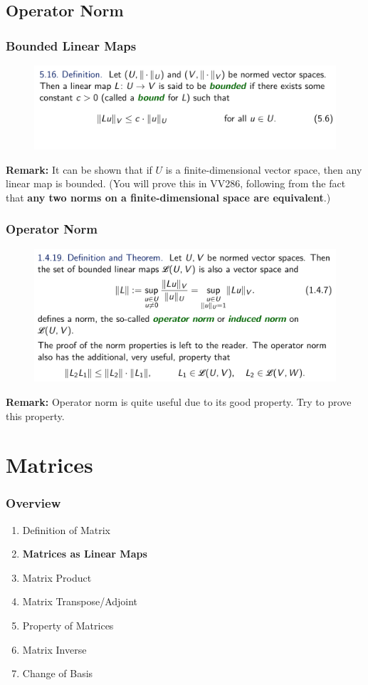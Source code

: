 \documentclass[12pt, t]{beamer}
\newcommand{\remark}{\textbf{Remark: }}
\begin{document}
\subsection{Operator Norm}
\begin{frame}
    \frametitle{Bounded Linear Maps}
    \begin{figure}[H]
        \centering
        \includegraphics[width=\textwidth]{2020-05-25-17-16-51.png}
    \end{figure}

    \remark  It can be shown that if $U$ is a finite-dimensional vector space, then any linear map is bounded. (You will prove this in VV286, following from the fact that \textbf{any two norms on a finite-dimensional space are equivalent}.)
\end{frame}

\begin{frame}
    \frametitle{Operator Norm}
    \begin{figure}[H]
        \centering
        \includegraphics[width=\textwidth]{2020-05-25-17-34-13.png}
    \end{figure}

    \remark Operator norm is quite useful due to its good property. Try to prove this property.
\end{frame}

\section{Matrices}
\begin{frame}
    \frametitle{Overview}
    \begin{enumerate}
        \item Definition of Matrix
        \item \textbf{Matrices as Linear Maps}
        \item Matrix Product
        \item Matrix Transpose/Adjoint
        \item Property of Matrices
        \item Matrix Inverse
        \item Change of Basis
    \end{enumerate}
\end{frame}
\end{document}
